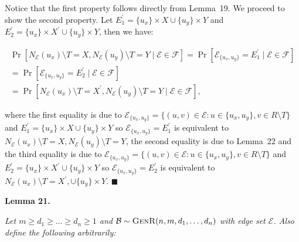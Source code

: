 \documentclass[10pt,a4paper]{article}
\begin{document}
Notice that the first property follows directly from Lemma 19.
We proceed to show the second property.
Let $E^{\prime}_{1}=\{u_{x}\}\times X\cup\{u_{y}\}\times Y$ and $E^{\prime}_{2}=\{u_{x}\}\times X^{\prime}\cup\{u_{y}\}\times Y$, then we have:\par


\[\begin{gathered}
\displaystyle\Pr[N_{\mathcal{E}}(u_{x})\setminus T=X,N_{\mathcal{E}}(u_{y})\setminus T=Y\mid\mathcal{E}\in\mathscr{F}] \displaystyle=\Pr[\mathcal{E}_{\{u_{x},u_{y}\}}=E^{\prime}_{1}\mid\mathcal{E}\in\mathscr{F}] \\
\displaystyle=\Pr[\mathcal{E}_{\{u_{x},u_{y}\}}=E^{\prime}_{2}\mid\mathcal{E}\in\mathscr{F}] \\
\displaystyle=\Pr[N_{\mathcal{E}}(u_{x})\setminus T=X^{\prime},N_{\mathcal{E}}(u_{y})\setminus T=Y\mid\mathcal{E}\in\mathscr{F}],
\end{gathered}\]


where the first equality is due to $\mathcal{E}_{\{u_{x},u_{y}\}}=\{(u,v)\in\mathcal{E}:u\in\{u_{x},u_{y}\},v\in R\setminus T\}$ and $E^{\prime}_{1}=\{u_{x}\}\times X\cup\{u_{y}\}\times Y$ so $\mathcal{E}_{\{u_{x},u_{y}\}}=E^{\prime}_{1}$ is equivalent to $N_{\mathcal{E}}(u_{x})\setminus T=X,N_{\mathcal{E}}(u_{y})\setminus T=Y$, the second equality is due to Lemma 22 and the third equality is due to $\mathcal{E}_{\{u_{x},u_{y}\}}=\{(u,v)\in\mathcal{E}:u\in\{u_{x},u_{y}\},v\in R\setminus T\}$ and $E^{\prime}_{2}=\{u_{x}\}\times X^{\prime}\cup\{u_{y}\}\times Y$ so $\mathcal{E}_{\{u_{x},u_{y}\}}=E^{\prime}_{2}$ is equivalent to $N_{\mathcal{E}}(u_{x})\setminus T=X^{\prime},\cup\{u_{y}\}\times Y$.
\ensuremath{\blacksquare}\par






\par\medskip\noindent\textbf{\textbf{Lemma 21}\textbf{.}}\par



\emph{Let $m\geq d_{1}\geq\dots\geq d_{n}\geq 1$ and $\mathcal{B}\sim\textsc{GenR}(n,m,d_{1},\dots,d_{n})$ with edge set $\mathcal{E}$.
Also define the following arbitrarily:}\par
\end{document}
